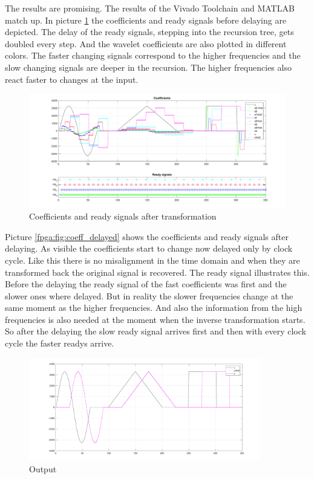 \begin{refsection}
The results are promising. The results of the Vivado Toolchain and MATLAB match up. 
In picture \ref{fpga:fig:coeff} the coefficients and ready signals before delaying are depicted.
The delay of the ready signals, stepping into the recursion tree, gets doubled every step. 
And the wavelet coefficients are also plotted in different colors. 
The faster changing signals correspond to the higher frequencies and the slow changing signals are deeper in the recursion.
The higher frequencies also react faster to changes at the input.
\begin{figure}
	\centering
	\includegraphics[width=\textwidth]{./images/coefs.pdf}
	\caption{Coefficients and ready signals after transformation \label{fpga:fig:coeff}}
\end{figure}

Picture \ref{fpga:fig:coeff_delayed} shows the coefficients and ready signals after delaying. 
As visible the coefficients start to change now delayed only by clock cycle. 
Like this there is no misalignment in the time domain and when they are transformed back the original signal is recovered. 
The ready signal illustrates this. 
Before the delaying the ready signal of the fast coefficients was first and the slower ones where delayed. 
But in reality the slower frequencies change at the same moment as the higher frequencies. 
And also the information from the high frequencies is also needed at the moment when the inverse transformation starts. 
So after the delaying the slow ready signal arrives first and then with every clock cycle the faster readys arrive. 
\begin{figure}[h]
	\centering
	\includegraphics[width=0.9\textwidth]{./images/output.pdf}
	\caption{Output \label{fpga:fig:output}}
\end{figure}


\end{refsection}
